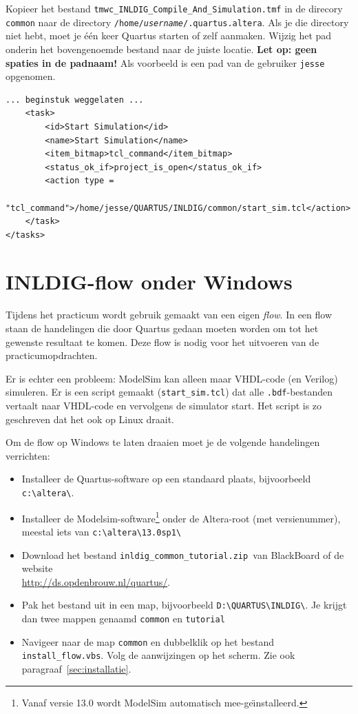 \documentclass[a4paper,12pt,fleqn,twoside]{book}
\newcommand{\naam}[1]{\texttt{#1}}
\begin{document}
Kopieer het bestand \lstinline|tmwc_INLDIG_Compile_And_Simulation.tmf| in de
direcory \naam{common} naar de directory
\naam{/home/\textsl{username}/.quartus.altera}.
Als je die directory niet hebt, moet je \'{e}\'{e}n keer Quartus starten of
zelf aanmaken. Wijzig het pad onderin het bovengenoemde bestand naar de
juiste locatie. \textbf{Let op: geen spaties in de padnaam!} Als
voorbeeld is een pad van de gebruiker \naam{jesse} opgenomen. 

\bigskip
\begin{lstlisting}[numbers=none]
... beginstuk weggelaten ...
    <task> 
        <id>Start Simulation</id> 
        <name>Start Simulation</name> 
        <item_bitmap>tcl_command</item_bitmap> 
        <status_ok_if>project_is_open</status_ok_if> 
        <action type =
            "tcl_command">/home/jesse/QUARTUS/INLDIG/common/start_sim.tcl</action> 
    </task> 
</tasks> 
\end{lstlisting}



\chapter{INLDIG-flow onder Windows}
\label{chap:inldigflowonderwindows}
Tijdens het practicum wordt gebruik gemaakt van een eigen \textsl{flow}.
In een flow staan de handelingen die door Quartus gedaan moeten worden om
tot het gewenste resultaat te komen. Deze flow is nodig voor het uitvoeren
van de practicumopdrachten. 

Er is echter een probleem: ModelSim kan alleen maar VHDL-code (en Verilog)
simuleren. Er is een script gemaakt (\lstinline|start_sim.tcl|) dat alle
\naam{.bdf}-bestanden vertaalt naar VHDL-code en vervolgens de simulator
start. Het script is zo geschreven dat het ook op Linux draait.
 
Om de flow op Windows te laten draaien moet je de volgende handelingen
verrichten:

\begin{itemize}\itemsep-1pt
\item Installeer de Quartus-software op een standaard plaats, bijvoorbeeld
      \lstinline|c:\altera\|.
\item Installeer de Modelsim-software\footnote{Vanaf versie 13.0 wordt
      ModelSim automatisch mee-ge\"{\i}nstalleerd.} onder de Altera-root
      (met versienummer), meestal iets van \lstinline|c:\altera\13.0sp1\| 
\item Download het bestand \lstinline|inldig_common_tutorial.zip |van
      BlackBoard of de website\\ \url{http://ds.opdenbrouw.nl/quartus/}. 
\item Pak het bestand uit in een map, bijvoorbeeld
      \lstinline|D:\QUARTUS\INLDIG\|. Je krijgt dan twee mappen genaamd
      \lstinline|common| en \lstinline|tutorial|
\item Navigeer naar de map \lstinline|common| en dubbelklik op het bestand
      \lstinline|install_flow.vbs|. Volg de aanwijzingen op het scherm. Zie
      ook paragraaf~\ref{sec:installatie}.
\end{itemize}
\end{document}

